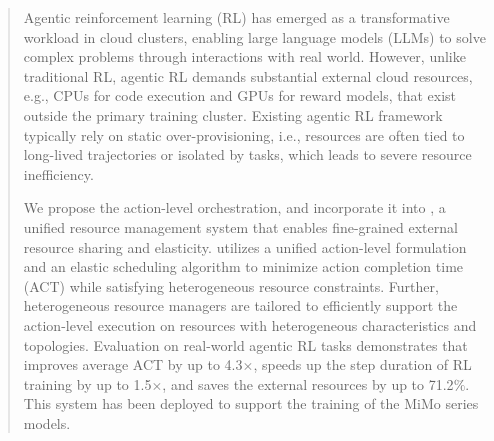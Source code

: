 \begin{abstract}

Agentic reinforcement learning (RL) has emerged as a transformative workload in cloud clusters, enabling large language models (LLMs) to solve complex problems through interactions with real world.
However, unlike traditional RL, agentic RL demands substantial external cloud resources, e.g., CPUs for code execution and GPUs for reward models, that exist outside the primary training cluster.
Existing agentic RL framework typically rely on static over-provisioning, i.e., resources are often tied to long-lived trajectories or isolated by tasks, which leads to severe resource inefficiency. 

We propose the action-level orchestration, and incorporate it into \sysname, a unified resource management system that enables fine-grained external resource sharing and elasticity. 
\sysname utilizes a unified action-level formulation and an elastic scheduling algorithm to minimize action completion time (ACT) while satisfying heterogeneous resource constraints. Further, heterogeneous resource managers are tailored to efficiently support the action-level execution on resources with heterogeneous characteristics and topologies.
Evaluation on real-world agentic RL tasks demonstrates that \sysname improves average ACT by up to 4.3$\times$, speeds up the step duration of RL training by up to 1.5$\times$, and saves the external resources by up to 71.2$\%$. This system has been deployed to support the training of the MiMo series models.
\end{abstract}